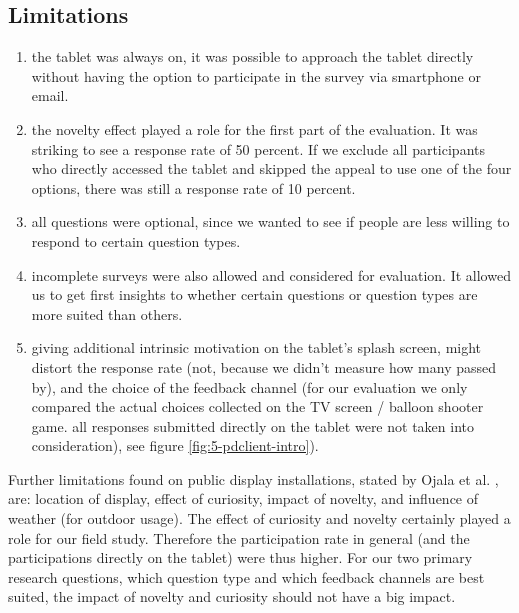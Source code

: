 \subsection{Limitations}

	\begin{enumerate}
	\item the tablet was always on, it was possible to approach the tablet directly without having the option to participate in the survey via smartphone or email. 
	\item the novelty effect played a role for the first part of the evaluation. It was striking to see a response rate of 50 percent. If we exclude all participants who directly accessed the tablet and skipped the appeal to use one of the four options, there was still a response rate of 10 percent.
	\item all questions were optional, since we wanted to see if people are less willing to respond to certain question types.
	\item incomplete surveys were also allowed and considered for evaluation. It allowed us to get first insights to whether certain questions or question types are more suited than others.
	\item giving additional intrinsic motivation on the tablet's splash screen, might distort the response rate (not, because we didn't measure how many passed by), and the choice of the feedback channel (for our evaluation we only compared the actual choices collected on the TV screen / balloon shooter game. all responses submitted directly on the tablet were not taken into consideration), see figure \ref{fig:5-pdclient-intro}).
	\end{enumerate}

	Further limitations found on public display installations, stated by Ojala et al. \cite{Ojala2011}, are: location of display, effect of curiosity, impact of novelty, and influence of weather (for outdoor usage). The effect of curiosity and novelty certainly played a role for our field study. Therefore the participation rate in general (and the participations directly on the tablet) were thus higher. For our two primary research questions, which question type and which feedback channels are best suited, the impact of novelty and curiosity should not have a big impact.

